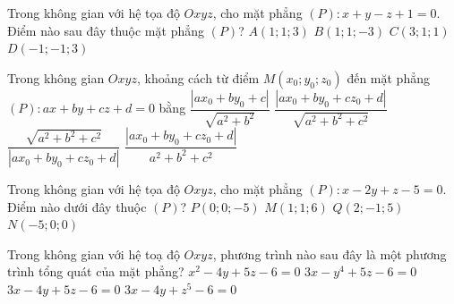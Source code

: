 

\begin{ex}%
	Trong không gian với hệ tọa độ $Oxyz$, cho mặt phẳng $(P)\colon x + y - z + 1 = 0$. Điểm nào sau  đây thuộc mặt phẳng $(P)$?
	\choice 
		{\True $A(1;1;3)$} 
		 {$B(1;1;-3)$}
		{$C(3;1;1)$} 
		{$D(-1;-1;3)$} 
\end{ex}

\begin{ex}%
	Trong không gian $Oxyz$, khoảng cách từ điểm $M\left(x_0;y_0;z_0\right)$ đến mặt phẳng $(P)\colon ax+by+cz+d=0$  bằng
	\choice 
		 {$\dfrac{\left|ax_0+by_0+c\right|}{\sqrt{a^2+b^2}}$}
		{\True $\dfrac{\left|ax_0+by_0+cz_0+d\right|}{\sqrt{a^2+b^2+c^2}}$} 
		 {$\dfrac{\sqrt{a^2+b^2+c^2}}{\left|ax_0+by_0+cz_0+d\right|}$}
		{$\dfrac{\left|ax_0+by_0+cz_0+d\right|}{a^2+b^2+c^2}$} 
\end{ex}

\begin{ex}%
	Trong không gian với hệ tọa độ $Oxyz$,  cho mặt phẳng $(P)\colon x - 2y + z - 5 = 0$. Điểm nào dưới đây thuộc $(P)$?
	\choice 
		 {$P(0;0;-5)$}
		 {\True $M(1;1;6)$}
		{$Q(2;-1;5)$} 
		{$N(-5;0;0)$} 
\end{ex}

\begin{ex}%
	Trong không gian với hệ toạ độ $Oxyz$, phương trình nào sau đây là một phương  trình tổng quát của mặt phẳng?
	 \choice
		 {$x^2-4y+5z-6=0$}
		{$3x-y^4+5z-6=0$} 
		{\True $3x-4y+5z-6=0$} 
		{$3x-4y+z^5-6=0$} 
\end{ex}

